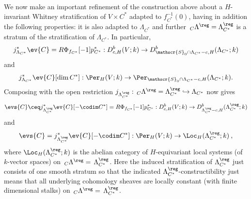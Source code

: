 \documentclass[11pt,letterpaper]{amsart}
\numberwithin{equation}{section}
\begin{document}
\begin{theorem}\label{theorem: refinement}
    We now make an important refinement of the construction above about a $H$-invariant Whitney stratification of $V\times C^*$ adapted to $f_{C^*}^{-1}(0)$, having in addition the following properties: it is also adapted to $\Lambda_{C^*}$ and further $\,_{C}\Lambda^\reg =\Lambda_{C^*}^\reg$ is a stratum of the stratification of $\Lambda_{C^*}$.
    In particular, 
\begin{equation} \label{evc-refined}
j^*_{\Lambda_{C^*}} \ev{C} = R\Phi_{f_{C^*}}[-1]p_{C^*}^* :  D^b_{c,H}(V;k) \to D^b_{\mathscr{S}_0\cap \Lambda_{C^*}-c,H}(\Lambda_{C^*};k)
\end{equation}
and
\begin{equation} \label{evc-refined-perv}
j^*_{\Lambda_{C^*}} \ev{C}[\dim C^*] : \Per_{H}(V;k) \to \Per_{\mathscr{S}_0\cap \Lambda_{C^*}-c,H}(\Lambda_{C^*};k).
\end{equation}
Composing with the open restriction $j_{\Lambda^\reg_{C^*}} : \,_{C}\Lambda^\reg ={\Lambda^\reg_{C^*}} \hookrightarrow \Lambda_{C^*}$ now gives
\begin{equation} \label{evcs-refined}
\evs{C} \ceq j^*_{\Lambda^\reg_{C^*}} \ev{C}[-\codim C^*] = R\Phi_{f_{C^*}}[-1]p_{C^*}^* :  D^b_{c,H}(V;k) \to D^b_{\Lambda^\reg_{C^*}-c,H}(\Lambda^\reg_{C^*};k)
\end{equation}
and 
\begin{equation} \label{evcs-refined-perv}
\evs{C} = j^*_{\Lambda_{C^*}^\reg} \ev{C}[-\codim C^*] : \Per_{H}(V;k) \to \Loc_{H}(\Lambda^\reg_{C^*};k)\:,
\end{equation}
where $\Loc_{H}(\Lambda^\reg_{C^*};k)$ is the abelian category of $H$-equivariant local systems (of $k$-vector spaces) on 
$\,_{C}\Lambda^\reg = \,\Lambda^\reg_{C^*}$.
Here the induced stratification of $\Lambda^\reg_{C^*}$ just consists of one smooth stratum so that the indicated 
$\Lambda^\reg_{C^*}$-constructibility just means that all underlying cohomology sheaves are locally constant (with finite dimensional stalks) on $\,_{C}\Lambda^\reg = \,\Lambda^\reg_{C^*}$.
\end{theorem}
\end{document}
